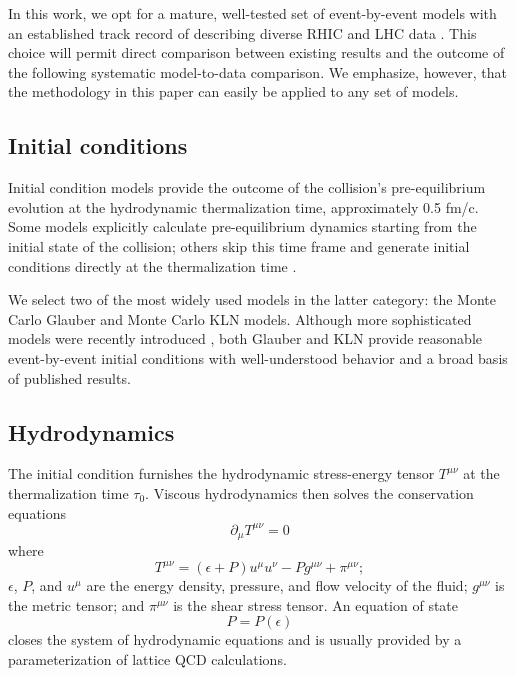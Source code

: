 \documentclass[aps,prc,reprint,superscriptaddress,amsmath]{revtex4-1}
\begin{document}
In this work, we opt for a mature, well-tested set of event-by-event models \cite{Shen:2014vra} with an established track record of describing diverse RHIC and LHC data \cite{Song:2010mg,Shen:2011zc,Song:2011hk}.
This choice will permit direct comparison between existing results and the outcome of the following systematic model-to-data comparison.
We emphasize, however, that the methodology in this paper can easily be applied to any set of models.

\subsection{Initial conditions}

Initial condition models provide the outcome of the collision's pre-equilibrium evolution at the hydrodynamic thermalization time, approximately 0.5 fm/c.
Some models explicitly calculate pre-equilibrium dynamics \cite{Schenke:2012wb} starting from the initial state of the collision; others skip this time frame and generate initial conditions directly at the thermalization time \cite{Drescher:2006pi,Miller:2007ri,Moreland:2014oya}.

We select two of the most widely used models in the latter category:
the Monte Carlo Glauber \cite{Miller:2007ri} and Monte Carlo KLN \cite{Drescher:2006pi} models.
Although more sophisticated models were recently introduced \cite{Schenke:2012wb,Moreland:2014oya}, both Glauber and KLN provide reasonable event-by-event initial conditions with well-understood behavior and a broad basis of published results.

\subsection{Hydrodynamics}

The initial condition furnishes the hydrodynamic stress-energy tensor $T^{\mu\nu}$ at the thermalization time $\tau_0$.
Viscous hydrodynamics then solves the conservation equations
\begin{equation}
  \partial_\mu T^{\mu\nu} = 0
\end{equation}
where
\begin{equation}
  T^{\mu\nu} = (\epsilon + P) u^\mu u^\nu - P g^{\mu\nu} + \pi^{\mu\nu};
\end{equation}
$\epsilon$, $P$, and $u^\mu$ are the energy density, pressure, and flow velocity of the fluid; $g^{\mu\nu}$ is the metric tensor; and $\pi^{\mu\nu}$ is the shear stress tensor.
An equation of state
\begin{equation}
  P = P(\epsilon)
\end{equation}
closes the system of hydrodynamic equations and is usually provided by a parameterization of lattice QCD calculations.
\end{document}
